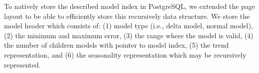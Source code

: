 \documentclass[10pt,conference,letterpaper]{IEEEtran}
\begin{document}
To natively store the described model index in PostgreSQL, we extended the page layout to be able to efficiently store this recursively data structure. We store the model header which consists of: (1) model type (i.e., delta model, normal model), (2) the minimum and maximum error, (3) the range where the model is valid, (4) the number of children models with pointer to model index, (5) the trend representation, and (6) the seasonality representation which may be recursively represented. 

 
  
 

\end{document}
